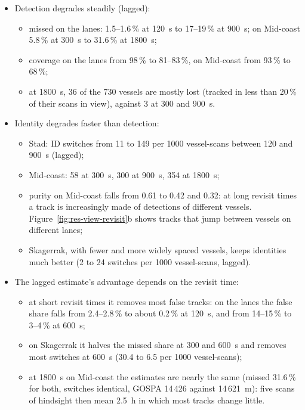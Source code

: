 \begin{itemize}
    \item Detection degrades steadily (lagged):
    \begin{itemize}
        \item missed on the lanes: 1.5--1.6\,\% at 120~s to 17--19\,\% at 900~s; on Mid-coast 5.8\,\% at 300~s to 31.6\,\% at 1800~s;
        \item coverage on the lanes from 98\,\% to 81--83\,\%, on Mid-coast from 93\,\% to 68\,\%;
        \item at 1800~s, 36 of the 730 vessels are mostly lost (tracked in less than 20\,\% of their scans in view), against 3 at 300 and 900~s.
    \end{itemize}
    \item Identity degrades faster than detection:
    \begin{itemize}
        \item Stad: ID switches from 11 to 149 per 1000 vessel-scans between 120 and 900~s (lagged);
        \item Mid-coast: 58 at 300~s, 300 at 900~s, 354 at 1800~s;
        \item purity on Mid-coast falls from 0.61 to 0.42 and 0.32: at long revisit times a track is increasingly made of detections of different vessels. Figure~\ref{fig:res-view-revisit}b shows tracks that jump between vessels on different lanes;
        \item Skagerrak, with fewer and more widely spaced vessels, keeps identities much better (2 to 24 switches per 1000 vessel-scans, lagged).
    \end{itemize}
    \item The lagged estimate's advantage depends on the revisit time:
    \begin{itemize}
        \item at short revisit times it removes most false tracks: on the lanes the false share falls from 2.4--2.8\,\% to about 0.2\,\% at 120~s, and from 14--15\,\% to 3--4\,\% at 600~s;
        \item on Skagerrak it halves the missed share at 300 and 600~s and removes most switches at 600~s (30.4 to 6.5 per 1000 vessel-scans);
        \item at 1800~s on Mid-coast the estimates are nearly the same (missed 31.6\,\% for both, switches identical, GOSPA 14\,426 against 14\,621~m): five scans of hindsight then mean 2.5~h in which most tracks change little.
    \end{itemize}

\end{itemize}
